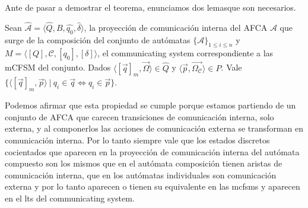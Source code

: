 Ante de pasar a demostrar el teorema, enunciamos dos lemasque son necesarios.

\begin{lemma} Sean $\hat{\mathcal{A}}=\langle \hat{Q}, B, \hat{q_0}, \hat{\delta} \rangle$, la proyección de comunicación interna del AFCA $\mathcal{A}$ que surge de la composición del conjunto de autómatas  $\{\mathcal{A}\}_{1 \leq i \leq n}$  y $M= \langle [Q], \mathcal{C}, [q_0], [\delta] \rangle$, el communicating system correspondiente a las mCFSM del conjunto. Dados $\langle [\overrightarrow{q}]_m, \overrightarrow{\Omega} \rangle \in \hat{Q}$ y $\langle \overrightarrow{p}, \overrightarrow{\Omega_{\mathcal{C}}} \rangle \in P$. Vale $\{\langle [\overrightarrow{q}]_m, \overrightarrow{p} \rangle \ | \ q_i \in \overrightarrow{q} \iff q_i \in \overrightarrow{p} \}$. 
\end{lemma}

Podemos afirmar que esta propiedad se cumple porque estamos partiendo de un conjunto de AFCA que carecen transiciones de comunicación interna, solo externa, y al componerlos las acciones de comunicación externa se transforman en comunicación interna. Por lo tanto siempre vale que los estados discretos cocientados que aparecen en la proyección de comunicación interna del autómata compuesto son los mismos que en el autómata composición tienen aristas de comunicación interna, que en los autómatas individuales son comunicación externa y por lo tanto aparecen o tienen su equivalente en las mcfsms y aparecen en el lts del communicating system.

